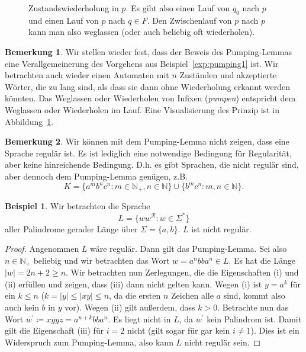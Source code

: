 \documentclass[11pt, a4paper]{article}
\theoremstyle{definition}
\newtheorem{example}[definition]{Beispiel}
\newtheorem*{remark*}{Bemerkung}
\theoremstyle{plain}
\numberwithin{equation}{section}
\begin{document}
\begin{figure}
	\centering
	
	\caption{Zustandswiederholung in \( p \). Es gibt also einen Lauf von \( q_0 \) nach \( p \) und einen Lauf von \( p \) nach \( q \in F \). Den Zwischenlauf von \( p \) nach \( p \) kann man also weglassen (oder auch beliebig oft wiederholen).}
	\label{fig:pumping}
\end{figure}
\begin{remark*}
	Wir stellen wieder fest, dass der Beweis des Pumping-Lemmas eine Verallgemeinerung des Vorgehens aus Beispiel~\ref{exp:pumping1} ist. Wir betrachten auch wieder einen Automaten mit \( n \) Zuständen und akzeptierte Wörter, die zu lang sind, als dass sie dann ohne Wiederholung erkannt werden könnten. Das Weglassen oder Wiederholen von Infixen (\textit{pumpen}) entspricht dem Weglassen oder Wiederholen im Lauf.
	Eine Visualisierung des Prinzip ist in Abbildung~\ref{fig:pumping}.
\end{remark*}
\begin{remark*}
	Wir können mit dem Pumping-Lemma nicht zeigen, dass eine Sprache regulär ist. Es ist lediglich eine notwendige Bedingung für Regularität, aber keine hinreichende Bedingung. D.h. es gibt Sprachen, die nicht regulär sind, aber dennoch dem Pumping-Lemma genügen, z.B.
	\[
		K = \{a^m b^n c^n : m \in \mathbb{N}_+, n \in \mathbb{N} \} \cup \{ b^m c^n : m, n \in \mathbb{N} \}.
	\]
\end{remark*}
\begin{example}
	Wir betrachten die Sprache
	\[
		L = \{ ww^\mathcal{R} : w \in \Sigma^\ast \}
	\]
	aller Palindrome gerader Länge über \( \Sigma = \{a, b\} \). \( L \) ist nicht regulär.
	\begin{proof}
		Angenommen \( L \) wäre regulär. Dann gilt das Pumping-Lemma. Sei also \( n \in \mathbb{N}_+ \) beliebig und wir betrachten das Wort \( w = a^n bb a^n \in L \). Es hat die Länge \( \left| w \right| = 2n+2 \geq n \). Wir betrachten nun Zerlegungen, die die Eigenschaften (i) und (ii) erfüllen und zeigen, dass (iii) dann nicht gelten kann. Wegen (i) ist \( y = a^k \) für ein \( k \leq n \) (\( k = \left| y \right| \leq \left| xy \right| \leq n \), da die ersten \( n \) Zeichen alle \( a \) sind, kommt also auch kein \( b \) in \( y \) vor). Wegen (ii) gilt außerdem, dass \( k > 0 \). Betrachte nun das Wort \( w^\prime \coloneqq xyyz = a^{n+k}bba^n \). Es liegt nicht in \( L \), da \( w^\prime \) kein Palindrom ist. Damit gilt die Eigenschaft (iii) für \( i = 2 \) nicht (gilt sogar für gar kein \( i \neq 1 \)). Dies ist ein Widerspruch zum Pumping-Lemma, also kann \( L \) nicht regulär sein. 
	\end{proof}
\end{example}
\end{document}
